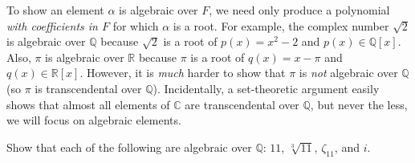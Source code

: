 To show an element $\alpha$ is algebraic over $F$, we need only produce a polynomial \emph{with coefficients in $F$} for which $\alpha$ is a root. For example, the complex number $\sqrt{2}$ is algebraic over $\mathbb{Q}$ because $\sqrt{2}$ is a root of $p(x) = x^2 - 2$ and $p(x) \in \mathbb{Q}[x]$. Also, $\pi$ is algebraic over $\mathbb{R}$ because $\pi$ is a root of $q(x) = x-\pi$ and $q(x) \in \mathbb{R}[x]$. However, it is \emph{much} harder to show that $\pi$ is \emph{not} algebraic over $\mathbb{Q}$ (so  $\pi$ is transcendental over $\mathbb{Q}$). Incidentally, a set-theoretic argument easily shows that almost all elements of $\mathbb{C}$ are transcendental over $\mathbb{Q}$, but never the less, we will focus on algebraic elements.

\begin{problem}
Show that each of the following are algebraic over $\mathbb{Q}$: $11$, $\sqrt[3]{11}$, $\zeta_{11}$, and $i$.
\end{problem}

